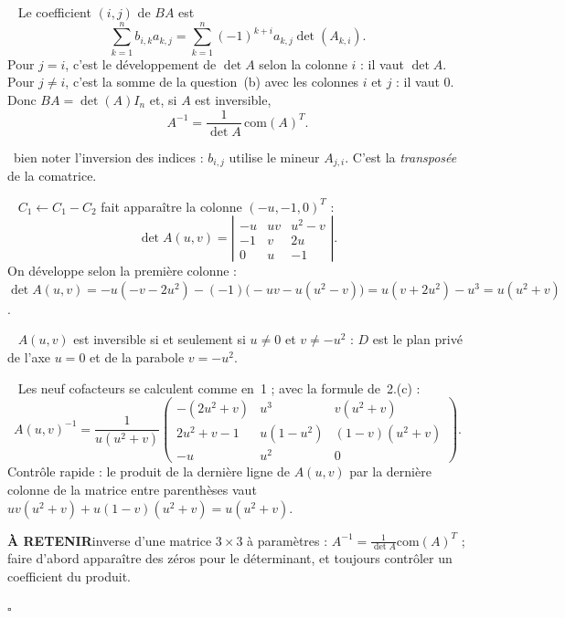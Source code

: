 \documentclass[a4paper,11pt]{article}
\numberwithin{equation}{section}
\numberwithin{figure}{section}
\numberwithin{table}{section}
\theoremstyle{enonce}
\theoremstyle{exemple}
\theoremstyle{remarque}
\newcommand{\dt}[1]{\left|\begin{matrix}#1\end{matrix}\right|}
\newcommand{\piege}[1]{\par\noindent{\sffamily\bfseries\small\color{Brique}Piège.}\ #1\par}
\newcommand{\retenir}[1]{\begin{retenirbox}{\sffamily\bfseries\footnotesize\color{Ocre}À RETENIR}\quad #1\end{retenirbox}}
\newcommand{\q}[1]{\par\smallskip\noindent{\sffamily\bfseries\color{Bleu}#1}\ }
\begin{document}
\q{2.(c)} Le coefficient $(i,j)$ de $BA$ est
\[\sum_{k=1}^nb_{i,k}a_{k,j}=\sum_{k=1}^n(-1)^{k+i}a_{k,j}\det(A_{k,i}).\]
Pour $j=i$, c'est le développement de $\det A$ selon la colonne $i$ : il vaut $\det A$. Pour $j\neq i$, c'est la somme de la question~(b) avec les colonnes $i$ et $j$ : il vaut $0$. Donc $BA=\det(A)I_n$ et, si $A$ est inversible,
\[A^{-1}=\frac1{\det A}\,\mathrm{com}(A)^T.\]
\piege{bien noter l'inversion des indices : $b_{i,j}$ utilise le mineur $A_{j,i}$. C'est la \emph{transposée} de la comatrice.}

\q{3.(a)} $C_1\leftarrow C_1-C_2$ fait apparaître la colonne $(-u,-1,0)^T$ :
\[\det A(u,v)=\dt{-u&uv&u^2-v\\-1&v&2u\\0&u&-1}.\]
On développe selon la première colonne : $\det A(u,v)=-u(-v-2u^2)-(-1)\big(-uv-u(u^2-v)\big)=u(v+2u^2)-u^3=u(u^2+v)$.

\q{3.(b)} $A(u,v)$ est inversible si et seulement si $u\neq0$ et $v\neq-u^2$ : $D$ est le plan privé de l'axe $u=0$ et de la parabole $v=-u^2$.

\q{3.(c)} Les neuf cofacteurs se calculent comme en~1 ; avec la formule de~2.(c) :
\[A(u,v)^{-1}=\frac1{u(u^2+v)}\begin{pmatrix}-(2u^2+v)&u^3&v(u^2+v)\\2u^2+v-1&u(1-u^2)&(1-v)(u^2+v)\\-u&u^2&0\end{pmatrix}.\]
Contrôle rapide : le produit de la dernière ligne de $A(u,v)$ par la dernière colonne de la matrice entre parenthèses vaut $uv(u^2+v)+u(1-v)(u^2+v)=u(u^2+v)$.
\retenir{inverse d'une matrice $3\times3$ à paramètres : $A^{-1}=\frac1{\det A}\mathrm{com}(A)^T$ ; faire d'abord apparaître des zéros pour le déterminant, et toujours contrôler un coefficient du produit.}
\par\hfill\textcolor{BleuClair}{$\square$}\par
\end{document}
